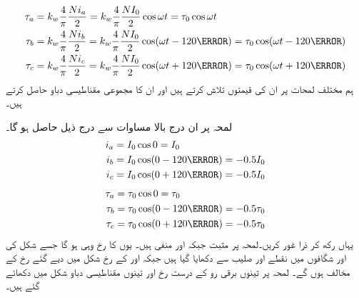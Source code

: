 %
\begin{gather}
\begin{aligned}\label{مساوات_گھومتے_مشین_تین_دور_دباو}
\tau_a&=k_w \frac{4}{\pi}\frac{N i_a}{2}=k_w \frac{4}{\pi}\frac{N I_0}{2} \cos \omega t=\tau_0 \cos \omega t\\
\tau_b&=k_w \frac{4}{\pi}\frac{N i_b}{2}=k_w \frac{4}{\pi}\frac{N I_0}{2} \cos (\omega t-120\degree)=\tau_0 \cos (\omega t-120\degree)\\
\tau_c&=k_w \frac{4}{\pi}\frac{N i_c}{2}=k_w \frac{4}{\pi}\frac{N I_0}{2} \cos (\omega t+120\degree)=\tau_0 \cos (\omega t+120\degree)
\end{aligned}
\end{gather}
 ہم مختلف لمحات پر ان کی قیمتوں  تلاش کرتے ہیں اور ان کا مجموعی مقناطیسی دباو حاصل کرتے ہیں۔

لمحہ  پر ان درج بالا مساوات سے درج ذیل حاصل ہو گا۔
\begin{gather}
\begin{aligned}
i_a&=I_0 \cos 0=I_0\\
i_b&=I_0 \cos (0-120\degree)=-0.5 I_0\\
i_c&=I_0 \cos (0+120\degree)=-0.5 I_0
\end{aligned}
\end{gather}
%
\begin{gather}
\begin{aligned}
\tau_a&=\tau_0 \cos 0=\tau_0\\
\tau_b&=\tau_0 \cos (0-120\degree)=-0.5 \tau_0\\
\tau_c&=\tau_0 \cos (0+120\degree)=-0.5 \tau_0
\end{aligned}
\end{gather}
یہاں رکھ کر ذرا غور کریں۔لمحہ   پر   مثبت  جبکہ  اور  منفی ہیں۔ یوں   کا رخ وہی  ہو گا جسے  شکل   کی   اور  شگافوں میں نقطے اور صلیب سے  دکھایا گیا ہیں جبکہ   اور  کے رخ شکل میں دیے گئے رخ کے مخالف ہوں گے۔ لمحہ  پر  تینوں برقی رو کے درست رخ اور  تینوں مقناطیسی دباو  شکل   میں دکھائے گئے ہیں۔
